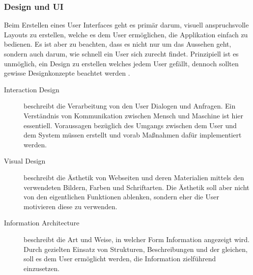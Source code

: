 \subsubsection{Design und UI}
\label{subsec:WAppDesign}

Beim Erstellen eines User Interfaces geht es primär darum, visuell anspruchsvolle Layouts zu erstellen, welche es dem User ermöglichen, die Applikation einfach zu bedienen. Es ist aber zu beachten, dass es nicht nur um das Aussehen geht, sondern auch darum, wie schnell ein User sich zurecht findet. Prinzipiell ist es unmöglich, ein Design zu erstellen welches jedem User gefällt, dennoch sollten gewisse Designkonzepte beachtet werden \cite{MELD.CH3-web-app.ui1}\cite{MELD.CH3-web-app.ui2}.

\begin{description}
\item[Interaction Design]
beschreibt die Verarbeitung von den User Dialogen und Anfragen. Ein Verständnis von Kommunikation zwischen Mensch und Maschine ist hier essentiell. Voraussagen bezüglich des Umgangs zwischen dem User und dem System müssen erstellt und vorab Maßnahmen dafür implementiert werden.

\item[Visual Design]
beschreibt die Ästhetik von Webseiten und deren Materialien mittels den verwendeten Bildern, Farben und Schriftarten. Die Ästhetik soll aber nicht von den eigentlichen Funktionen ablenken, sondern eher die User motivieren diese zu verwenden.

\item[Information Architecture]
beschreibt die Art und Weise, in welcher Form Information angezeigt wird. Durch gezielten Einsatz von Strukturen, Beschreibungen und der gleichen, soll es dem User ermöglicht werden, die Information zielführend einzusetzen.
\end{description}

